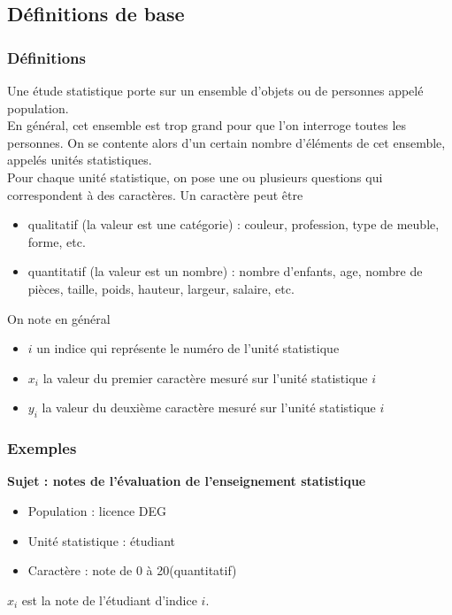 \documentclass[10pt, french]{beamer}
\begin{document}
\subsection{Définitions de base}
\begin{frame}\frametitle{Définitions}
  Une étude statistique porte sur un ensemble d'objets ou de personnes appelé \alert{population}. \\
  
  En général, cet ensemble est trop grand pour que l'on interroge toutes les personnes. On se contente alors d'un certain nombre d'éléments de cet ensemble, appelés \alert{unités statistiques}. \\
  
  Pour chaque unité statistique, on pose une ou plusieurs questions qui correspondent à des \alert{caractères}. Un caractère peut être 
  \begin{itemize}
  \item qualitatif (la valeur est une catégorie) : couleur, profession, type de meuble, forme, etc.
  \item quantitatif (la valeur est un nombre) : nombre d'enfants, age, nombre de pièces, taille, poids, hauteur, largeur, salaire, etc.
  \end{itemize}
On note en général 
 \begin{itemize}
 \item $i$ un indice qui représente le numéro de l'unité statistique
 \item $x_i$ la valeur du premier caractère mesuré sur l'unité statistique $i$
 \item $y_i$ la valeur du deuxième caractère mesuré sur l'unité statistique $i$
 \end{itemize}  
\end{frame}
\begin{frame}\frametitle{Exemples}
  \textbf{Sujet : notes de l'évaluation de l'enseignement statistique}
  \begin{itemize}
  \item Population : licence DEG
  \item Unité statistique : étudiant
  \item Caractère : note de 0 à 20(quantitatif)
  \end{itemize}
$x_i$ est la note de l'étudiant d'indice $i$. 
\end{frame}
\end{document}
